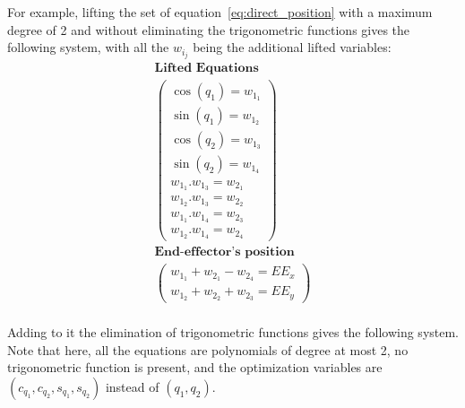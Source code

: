 For example, lifting the set of equation~\ref{eq:direct_position} with a maximum degree of 2 and without eliminating the trigonometric functions gives the following system, with all the $w_{i_j}$ being the additional lifted variables:
\begin{equation}
  \begin{array}{c}
  \textbf{Lifted Equations}\\
  \left(
    \begin{array}{c}
      \cos(q_1) = w_{1_1}\\
      \sin(q_1) = w_{1_2}\\
      \cos(q_2) = w_{1_3}\\
      \sin(q_2) = w_{1_4}\\
      w_{1_1}.w_{1_3} = w_{2_1}\\
      w_{1_2}.w_{1_3} = w_{2_2}\\
      w_{1_1}.w_{1_4} = w_{2_3}\\
      w_{1_2}.w_{1_4} = w_{2_4}
    \end{array}
  \right)\\
  \textbf{End-effector's position}\\
  \left(\begin{array}{c}
      w_{1_1} + w_{2_1} - w_{2_4} = EE_x\\
      w_{1_2} + w_{2_2} + w_{2_3} = EE_y
    \end{array}
  \right)\\
  \end{array}
\end{equation}
\label{eq:lifted_equations}

Adding to it the elimination of trigonometric functions gives the following system.
Note that here, all the equations are polynomials of degree at most 2, no trigonometric function is present, and the optimization variables are $\left(c_{q_1}, c_{q_2}, s_{q_1}, s_{q_2}\right)$ instead of $\left(q_1, q_2\right)$.

